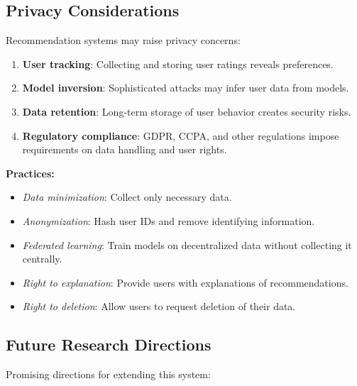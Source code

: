 \subsection{Privacy Considerations}

Recommendation systems may raise privacy concerns:

\begin{enumerate}
  \item \textbf{User tracking}: Collecting and storing user ratings reveals preferences.
  
  \item \textbf{Model inversion}: Sophisticated attacks may infer user data from models.
  
  \item \textbf{Data retention}: Long-term storage of user behavior creates security risks.
  
  \item \textbf{Regulatory compliance}: GDPR, CCPA, and other regulations impose requirements on 
  data handling and user rights.
\end{enumerate}

\textbf{Practices:}
\begin{itemize}
  \item \textit{Data minimization}: Collect only necessary data.
  
  \item \textit{Anonymization}: Hash user IDs and remove identifying information.
  
  \item \textit{Federated learning}: Train models on decentralized data without collecting it centrally.
  
  \item \textit{Right to explanation}: Provide users with explanations of recommendations.
  
  \item \textit{Right to deletion}: Allow users to request deletion of their data.
\end{itemize}

\subsection{Future Research Directions}

Promising directions for extending this system:

